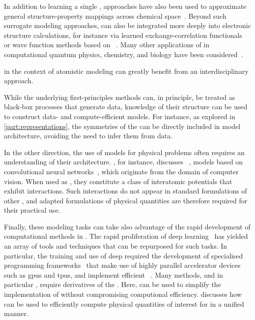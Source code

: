 In addition to learning a single \pes, \ml approaches have also been used to approximate general structure-\allowbreak property mappings across chemical space~\cite{rtml2012Aq,hl2021q}.
Beyond such surrogate modeling approaches, \ml can also be integrated more deeply into electronic structure calculations, for instance via learned exchange-correlation functionals~\cite{kmhc2021q,seqd2022q} or wave function methods based on \nns~\cite{hscn2022a}.
Many other applications of \ml in computational quantum physics, chemistry, and biology have been considered~\cite{mkr2016q,hsl2018q,ccvz2019q,ntmc2020q,sctm2020q}.

 \ml in the context of atomistic modeling can greatly benefit from an interdisciplinary approach.

While the underlying first-principles methods can, in principle, be treated as black-box processes that generate data, knowledge of their structure can be used to construct data- and compute-efficient models. For instance, as explored in \cref{part:representations}, the symmetries of the \bo \pes can be directly included in model architecture, avoiding the need to infer them from data. 

In the other direction, the use of \ml models for physical problems often requires an understanding of their architecture. , for instance, discusses \mpnns~\cite{gsvd2017q}, models based on convolutional neural networks~\cite{lbhj1989m,ksh2012m}, which originate from the domain of computer vision. When used as \mlps, they constitute a class of interatomic potentials that exhibit  interactions. Such interactions do not appear in standard formulations of other \ffs, and adapted formulations of physical quantities are therefore required for their practical use.

Finally, these modeling tasks can take also advantage of the rapid development of computational methods in \ml. The rapid proliferation of deep learning~\cite{s2015m} has yielded an array of tools and techniques that can be repurposed for such tasks.
In particular, the training and use of deep \nns required the development of specialised programming frameworks~\cite{tensorflow,pytorch,jax} that make use of highly parallel accelerator devices such as \glspl{gpu} and \glspl{tpu}, and implement efficient \ad~\cite{rhw1986m,griewank2008,bprs2017m}. Many methods, and in particular \md, require derivatives of the \pes. Here, \ad can be used to simplify the implementation of \ffs without compromising computional efficiency.  discusses how \ad can be used to efficiently compute physical quantities of interest for \mlps in a unified manner.

